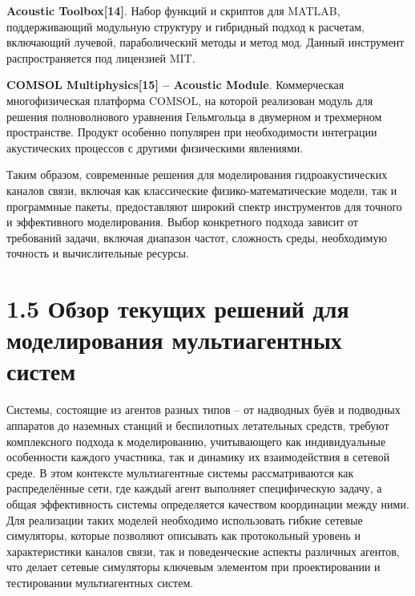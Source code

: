 \textbf{Acoustic Toolbox{[}14{]}}. Набор функций и скриптов для MATLAB,
поддерживающий модульную структуру и гибридный подход к расчетам,
включающий лучевой, параболический методы и метод мод. Данный инструмент
распространяется под лицензией MIT.

\textbf{COMSOL Multiphysics{[}15{]} -- Acoustic Module}. Коммерческая
многофизическая платформа COMSOL, на которой реализован модуль для
решения полноволнового уравнения Гельмгольца в двумерном и трехмерном
пространстве. Продукт особенно популярен при необходимости интеграции
акустических процессов с другими физическими явлениями.

Таким образом, современные решения для моделирования гидроакустических
каналов связи, включая как классические физико-математические модели,
так и программные пакеты, предоставляют широкий спектр инструментов для
точного и эффективного моделирования. Выбор конкретного подхода зависит
от требований задачи, включая диапазон частот, сложность среды,
необходимую точность и вычислительные ресурсы.

\section*{1.5 Обзор текущих решений для моделирования мультиагентных
систем}\label{ux43eux431ux437ux43eux440-ux442ux435ux43aux443ux449ux438ux445-ux440ux435ux448ux435ux43dux438ux439-ux434ux43bux44f-ux43cux43eux434ux435ux43bux438ux440ux43eux432ux430ux43dux438ux44f-ux43cux443ux43bux44cux442ux438ux430ux433ux435ux43dux442ux43dux44bux445-ux441ux438ux441ux442ux435ux43c}

Системы, состоящие из агентов разных типов -- от надводных буёв и
подводных аппаратов до наземных станций и беспилотных летательных
средств, требуют комплексного подхода к моделированию, учитывающего как
индивидуальные особенности каждого участника, так и динамику их
взаимодействия в сетевой среде. В этом контексте мультиагентные системы
рассматриваются как распределённые сети, где каждый агент выполняет
специфическую задачу, а общая эффективность системы определяется
качеством координации между ними. Для реализации таких моделей
необходимо использовать гибкие сетевые симуляторы, которые позволяют
описывать как протокольный уровень и характеристики каналов связи, так и
поведенческие аспекты различных агентов, что делает сетевые симуляторы
ключевым элементом при проектировании и тестировании мультиагентных
систем.


